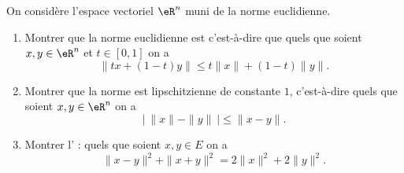 \begin{exercice}[\minsyndical]\label{exoEspVectoNorme0001}

On considère l'espace vectoriel $\eR^n$ muni de la norme euclidienne.
\begin{enumerate}
	\item
		Montrer que la norme euclidienne est  c'est-à-dire que quels que soient  $ x,y  \in \eR^n $ et $ t \in [0,1]$ on a
		 \begin{equation}
	 		\|tx + (1-t)y\| \le t\|x\| + (1-t)\|y\|.
		 \end{equation}
	 
	\item
		 Montrer que la norme est lipschitzienne de constante $1$,  c'est-à-dire
	        quels que soient  $ x,y  \in \eR^n$ on a
		\begin{equation}
		         \left| \ \|x\| - \|y\| \ \right| \le \|x-y\|. 
		\end{equation}
 \item
	 Montrer l' :
        quels que soient  $ x,y  \in E $ on a
	\begin{equation}
	        \|x-y\|^2 + \|x+y\|^2 = 2\|x\|^2 + 2\|y\|^2 .
	\end{equation}
		
\end{enumerate}


\end{exercice}
